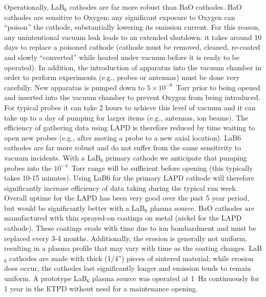 \documentclass[11pt]{article}
\begin{document}
Operationally, LaB$_6$ cathodes are far more robust than BaO cathodes.
BaO cathodes are sensitive to Oxygen; any significant exposure to
Oxygen can ``poison'' the cathode, substantially lowering its
emission current. For this reason, any unintentional vacuum leak leads
to an extended shutdown: it takes around 10 days to replace a poisoned
cathode (cathode must be removed, cleaned, re-coated and slowly
``converted'' while heated under vacuum before it is ready to be
operated). In addition, the introduction of apparatus into the vacuum
chamber in order to perform experiments (e.g., probes or antennas) must
be done very carefully. New apparatus is pumped down to $5\times
10^{-6}$~Torr prior to being opened and inserted into the vacuum
chamber to prevent Oxygen from being introduced. For typical probes it
can take 2 hours to achieve this level of vacuum and it can take up to
a day of pumping for larger items (e.g., antennas, ion beams). The
efficiency of gathering data using LAPD is therefore reduced by time
waiting to open new probes (e.g.,  after moving a probe to a new axial
location). LaB6 cathodes are far more robust and do not suffer from
the same sensitivity to vacuum incidents.  With a LaB$_6$ primary
cathode we anticipate that pumping probes into the $10^{-4}$~Torr
range will be sufficient before opening (this typically takes 10-15
minutes).  Using LaB6 for the primary LAPD cathode will therefore
significantly increase efficiency of data taking during the typical
run week. Overall uptime for the LAPD has been very good over the past
5 year period, but would be significantly better with a LaB$_6$ plasma
source. BaO cathodes are manufactured with thin sprayed-on coatings on
metal (nickel for the LAPD cathode).  These coatings erode with time
due to ion bombardment and must be replaced every 3-4 months.
Additionally, the erosion is generally not uniform, resulting in a
 plasma profile that may vary with time as the coating
changes.  LaB$_6$ cathodes are made with thick (1/4'') pieces of
sintered material; while erosion does occur, the cathodes last
significantly longer and emission tends to remain uniform. A prototype
LaB$_6$ plasma source was operated at 1~Hz continuously for 1 year in
the ETPD without need for a maintenance opening.
\end{document}
